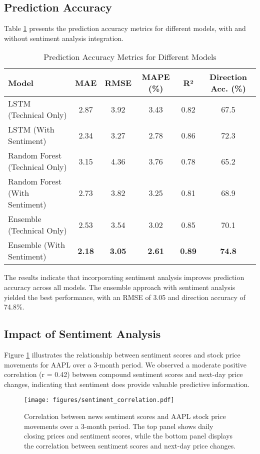 \documentclass[review]{elsarticle}
\begin{document}
\subsection{Prediction Accuracy}

Table \ref{tab:prediction-accuracy} presents the prediction accuracy metrics for different models, with and without sentiment analysis integration.

\begin{table}[h]
\centering
\caption{Prediction Accuracy Metrics for Different Models}
\label{tab:prediction-accuracy}
\begin{tabular}{lccccc}
\toprule
\textbf{Model} & \textbf{MAE} & \textbf{RMSE} & \textbf{MAPE (\%)} & \textbf{R²} & \textbf{Direction Acc. (\%)} \\
\midrule
LSTM (Technical Only) & 2.87 & 3.92 & 3.43 & 0.82 & 67.5 \\
LSTM (With Sentiment) & 2.34 & 3.27 & 2.78 & 0.86 & 72.3 \\
Random Forest (Technical Only) & 3.15 & 4.36 & 3.76 & 0.78 & 65.2 \\
Random Forest (With Sentiment) & 2.73 & 3.82 & 3.25 & 0.81 & 68.9 \\
Ensemble (Technical Only) & 2.53 & 3.54 & 3.02 & 0.85 & 70.1 \\
Ensemble (With Sentiment) & \textbf{2.18} & \textbf{3.05} & \textbf{2.61} & \textbf{0.89} & \textbf{74.8} \\
\bottomrule
\end{tabular}
\end{table}

The results indicate that incorporating sentiment analysis improves prediction accuracy across all models. The ensemble approach with sentiment analysis yielded the best performance, with an RMSE of 3.05 and direction accuracy of 74.8\%.

\subsection{Impact of Sentiment Analysis}

Figure \ref{fig:sentiment-correlation} illustrates the relationship between sentiment scores and stock price movements for AAPL over a 3-month period. We observed a moderate positive correlation (r = 0.42) between compound sentiment scores and next-day price changes, indicating that sentiment does provide valuable predictive information.

\begin{figure}[h]
\centering
\texttt{[image: figures/sentiment\_correlation.pdf]}
\caption{Correlation between news sentiment scores and AAPL stock price movements over a 3-month period. The top panel shows daily closing prices and sentiment scores, while the bottom panel displays the correlation between sentiment scores and next-day price changes.}
\label{fig:sentiment-correlation}
\end{figure}
\end{document}
